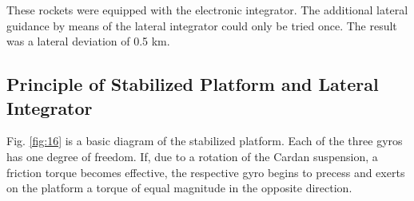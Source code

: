 \documentclass[12pt, a4paper]{article}
\begin{document}
These rockets were equipped with the electronic integrator. The additional lateral guidance by means of the lateral integrator could only be tried once. The result was a lateral deviation of 0.5 km.

\subsection{Principle of Stabilized Platform and Lateral Integrator}

Fig. \ref{fig:16} is a basic diagram of the stabilized platform. Each of the three gyros has one degree of freedom. If, due to a rotation of the Cardan suspension, a friction torque becomes effective, the respective gyro begins to precess and exerts on the platform a torque of equal magnitude in the opposite direction.
\end{document}
